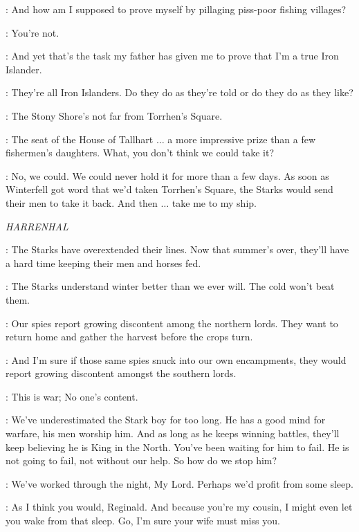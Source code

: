 \THEON: And how am I supposed to prove myself by pillaging piss-poor fishing villages? 

\DAGMER: You're not. 

\THEON: And yet that's the task my father has given me to prove that I'm a true Iron Islander. 

\DAGMER: They're all Iron Islanders. Do they do as they're told or do they do as they like? 

\THEON: The Stony Shore's not far from Torrhen's Square. 

\DAGMER: The seat of the House of Tallhart $\ldots$ a more impressive prize than a few fishermen's daughters. What, you don't think we could take it? 

\THEON: No, we could. We could never hold it for more than a few days. As soon as Winterfell got word that we'd taken Torrhen's Square, the Starks would send their men to take it back. And then $\ldots$ take me to my ship. 


\scene

\textit{HARRENHAL} 


\REGINALD: The Starks have overextended their lines. Now that summer's over, they'll have a hard time keeping their men and horses fed. 

\TYWIN: The Starks understand winter better than we ever will. The cold won't beat them. 

\AMORY: Our spies report growing discontent among the northern lords. They want to return home and gather the harvest before the crops turn. 

\TYWIN: And I'm sure if those same spies snuck into our own encampments, they would report growing discontent amongst the southern lords. 

\REGINALD: This is war; No one's content. 

\TYWIN: We've underestimated the Stark boy for too long. He has a good mind for warfare, his men worship him. And as long as he keeps winning battles, they'll keep believing he is King in the North. You've been waiting for him to fail. He is not going to fail, not without our help. So how do we stop him? 

\REGINALD: We've worked through the night, My Lord. Perhaps we'd profit from some sleep. 

\TYWIN: As I think you would, Reginald. And because you're my cousin, I might even let you wake from that sleep. Go, I'm sure your wife must miss you. 

